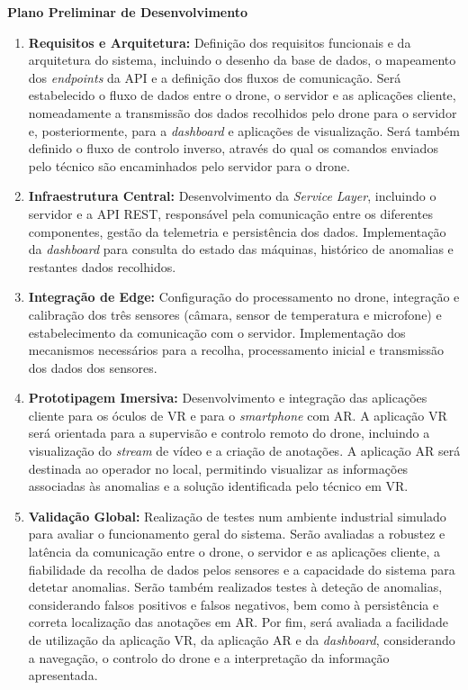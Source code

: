 \documentclass[conference,a4paper]{IEEEtran}
\begin{document}
\textbf{Plano Preliminar de Desenvolvimento}
\begin{enumerate}
    \item \textbf{Requisitos e Arquitetura:} Definição dos requisitos funcionais e da arquitetura do sistema, incluindo o desenho da base de dados, o mapeamento dos \textit{endpoints} da API e a definição dos fluxos de comunicação. Será estabelecido o fluxo de dados entre o drone, o servidor e as aplicações cliente, nomeadamente a transmissão dos dados recolhidos pelo drone para o servidor e, posteriormente, para a \textit{dashboard} e aplicações de visualização. Será também definido o fluxo de controlo inverso, através do qual os comandos enviados pelo técnico são encaminhados pelo servidor para o drone.

    \item \textbf{Infraestrutura Central:} Desenvolvimento da \textit{Service Layer}, incluindo o servidor e a API REST, responsável pela comunicação entre os diferentes componentes, gestão da telemetria e persistência dos dados. Implementação da \textit{dashboard} para consulta do estado das máquinas, histórico de anomalias e restantes dados recolhidos.

    \item \textbf{Integração de Edge:} Configuração do processamento no drone, integração e calibração dos três sensores (câmara, sensor de temperatura e microfone) e estabelecimento da comunicação com o servidor. Implementação dos mecanismos necessários para a recolha, processamento inicial e transmissão dos dados dos sensores.

    \item \textbf{Prototipagem Imersiva:} Desenvolvimento e integração das aplicações cliente para os óculos de VR e para o \textit{smartphone} com AR. A aplicação VR será orientada para a supervisão e controlo remoto do drone, incluindo a visualização do \textit{stream} de vídeo e a criação de anotações. A aplicação AR será destinada ao operador no local, permitindo visualizar as informações associadas às anomalias e a solução identificada pelo técnico em VR.

    \item \textbf{Validação Global:} Realização de testes num ambiente industrial simulado para avaliar o funcionamento geral do sistema. Serão avaliadas a robustez e latência da comunicação entre o drone, o servidor e as aplicações cliente, a fiabilidade da recolha de dados pelos sensores e a capacidade do sistema para detetar anomalias. Serão também realizados testes à deteção de anomalias, considerando falsos positivos e falsos negativos, bem como à persistência e correta localização das anotações em AR. Por fim, será avaliada a facilidade de utilização da aplicação VR, da aplicação AR e da \textit{dashboard}, considerando a navegação, o controlo do drone e a interpretação da informação apresentada.
\end{enumerate}
\end{document}
